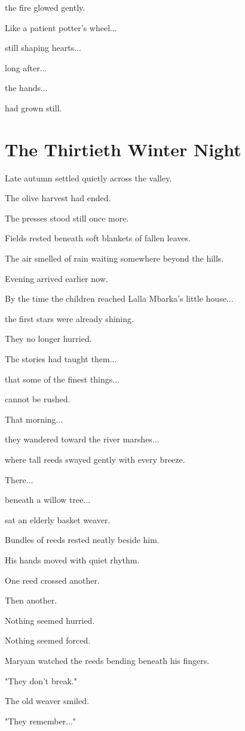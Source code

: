 \documentclass[12pt,openany]{book}
\begin{document}
the fire glowed gently.

Like a patient potter's wheel...

still shaping hearts...

long after...

the hands...

had grown still.
\chapter{The Thirtieth Winter Night}

Late autumn settled quietly across the valley.

The olive harvest had ended.

The presses stood still once more.

Fields rested beneath soft blankets of fallen leaves.

The air smelled of rain waiting somewhere beyond the hills.

Evening arrived earlier now.

By the time the children reached Lalla Mbarka's little house...

the first stars were already shining.

They no longer hurried.

The stories had taught them...

that some of the finest things...

cannot be rushed.

That morning...

they wandered toward the river marshes...

where tall reeds swayed gently with every breeze.

There...

beneath a willow tree...

sat an elderly basket weaver.

Bundles of reeds rested neatly beside him.

His hands moved with quiet rhythm.

One reed crossed another.

Then another.

Nothing seemed hurried.

Nothing seemed forced.

Maryam watched the reeds bending beneath his fingers.

"They don't break."

The old weaver smiled.

"They remember..."
\end{document}
